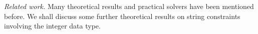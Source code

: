
%
%
%
%
%
 
\noindent\emph{Related work.}
Many theoretical results and practical solvers have been mentioned before. We shall discuss some further theoretical results on string constraints involving the integer data type.
%
%
%
%
